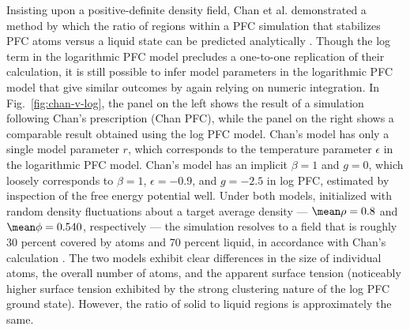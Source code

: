 Insisting upon a positive-definite density field, Chan et al. demonstrated a method by which the ratio of regions within a PFC simulation that stabilizes PFC atoms versus a liquid state can be predicted analytically \cite{chan2009vacancy}.  Though the log term in the logarithmic PFC model precludes a one-to-one replication of their calculation, it is still possible to infer model parameters in the logarithmic PFC model that give similar outcomes by again relying on numeric integration.  In Fig.~\ref{fig:chan-v-log}, the panel on the left shows the result of a simulation following Chan's prescription (Chan PFC), while the panel on the right shows a comparable result obtained using the log PFC model.  Chan's model has only a single model parameter $r$, which corresponds to the temperature parameter $\epsilon$ in the logarithmic PFC model.  Chan's model has an implicit $\beta = 1$ and $g = 0$, which loosely corresponds to $\beta = 1$, $\epsilon = -0.9$, and $g = -2.5$ in log PFC, estimated by inspection of the free energy potential well.  Under both models, initialized with random density fluctuations about a target average density --- $\mean\rho = 0.8$ and $\mean\phi = 0.540$, respectively --- the simulation resolves to a field that is roughly 30 percent covered by atoms and 70 percent liquid, in accordance with Chan's calculation \cite{chan2009vacancy}.  The two models exhibit clear differences in the size of individual atoms, the overall number of atoms, and the apparent surface tension (noticeably higher surface tension exhibited by the strong clustering nature of the log PFC ground state).  However, the ratio of solid to liquid regions is approximately the same.
%
